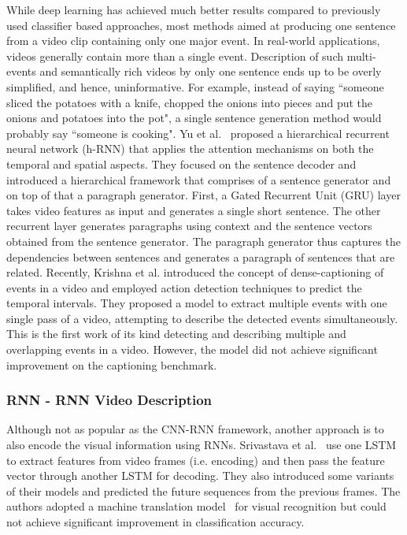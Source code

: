 \documentclass[10pt,journal,compsoc]{IEEEtran}
\begin{document}
While deep learning has achieved much better results compared to previously used classifier based approaches, most methods aimed at producing one sentence from a video clip containing only one major event. In real-world applications, videos generally contain more than a single event. Description of such multi-events and semantically rich videos by only one sentence ends up to be overly simplified, and hence, uninformative. For example, instead of saying ``someone sliced the potatoes with a knife, chopped the onions into pieces and put the onions and potatoes into the pot", a single sentence generation method would probably say ``someone is cooking". Yu et al.~\cite{yu2016video} proposed a hierarchical recurrent neural network (h-RNN) that applies the attention mechanisms on both the temporal and spatial aspects. They focused on the sentence decoder and introduced a hierarchical framework that comprises of a sentence generator and on top of that a paragraph generator. First, a Gated Recurrent Unit (GRU) layer takes video features as input and generates a single short sentence. The other recurrent layer generates paragraphs using context and the sentence vectors obtained from the sentence generator. The paragraph generator thus captures the dependencies between sentences and generates a paragraph of sentences that are related.
Recently, Krishna et al. \cite{krishna2017dense} introduced the concept of dense-captioning of events in a video and employed action detection techniques to predict the temporal intervals. They proposed a model to extract multiple events with one single pass of a video, attempting to describe the detected events simultaneously. This is the first work of its kind detecting and describing multiple and overlapping events in a video. However, the model did not achieve significant improvement on the captioning benchmark.

\subsubsection{RNN - RNN Video Description}%
Although not as popular as the CNN-RNN framework, another approach is to also encode the visual information using RNNs. Srivastava et al.~\cite{srivastava2015unsupervised} use one LSTM to extract features from video frames (i.e. encoding) and then pass the feature vector through another LSTM for decoding. They also introduced some variants of their models and predicted the future sequences from the previous frames. The authors adopted a machine translation model~\cite{sutskever2014sequence} for visual recognition but could not achieve significant improvement in classification accuracy.
\end{document}
